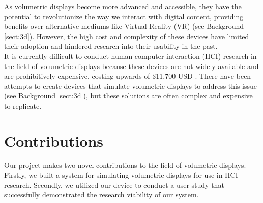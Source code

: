 As volumetric displays become more advanced and accessible, they have the potential to revolutionize the way we interact with digital content, providing benefits over alternative mediums like Virtual Reality (VR) (see Background \ref{sect:3d}). However, the high cost and complexity of these devices have limited their adoption and hindered research into their usability in the past. \\

It is currently difficult to conduct human-computer interaction (HCI) research in the field of volumetric displays because these devices are not widely available and are prohibitively expensive, costing upwards of \$11,700 USD \cite{noauthor_products_nodate}. There have been attempts to create devices that simulate volumetric displays to address this issue (see Background \ref{sect:3d}), but these solutions are often complex and expensive to replicate.

\section{Contributions}

Our project makes two novel contributions to the field of volumetric displays. Firstly, we built a system for simulating volumetric displays for use in HCI research. Secondly, we utilized our device to conduct a user study that successfully demonstrated the research viability of our system.

